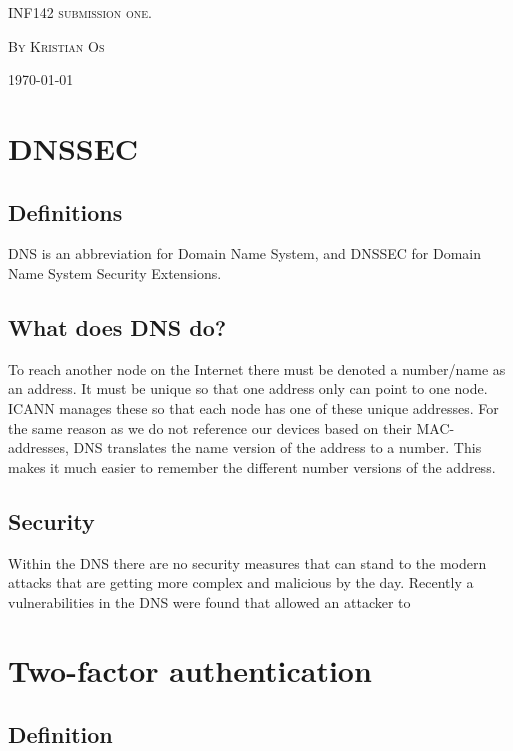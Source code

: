 \documentclass{article}
\begin{document}
	\begin{titlepage}
		\centering
		{\scshape\Large INF142 submission one.\par}
		\vspace{3em}
		{{\scshape\large By Kristian Os \par}}
		\vfill
		\large\today
	\end{titlepage}
	\tableofcontents
	\pagebreak
	
	\section{DNSSEC}
		\subsection{Definitions}
		DNS is an abbreviation for Domain Name System,
		and DNSSEC for Domain Name System Security Extensions. 
		
		\subsection{What does DNS do?}
		To reach another node on the Internet there must be denoted a number/name as an address. It must be unique so that one address only can point to one node.\\
		ICANN manages these so that each node has one of these unique addresses. For the same reason as we do not reference our devices based on their MAC-addresses, DNS translates the name version of the address to a number. This makes it much easier to remember the different number versions of the address.
		
		\subsection{Security}
		Within the DNS there are no security measures that can stand to the modern attacks that are getting more complex and malicious by the day. Recently a vulnerabilities in the DNS were found that allowed an attacker to 
		
	
	\clearpage
	\section{Two-factor authentication}
		\subsection{Definition}
	\nocite{*}
	
	
\end{document}
